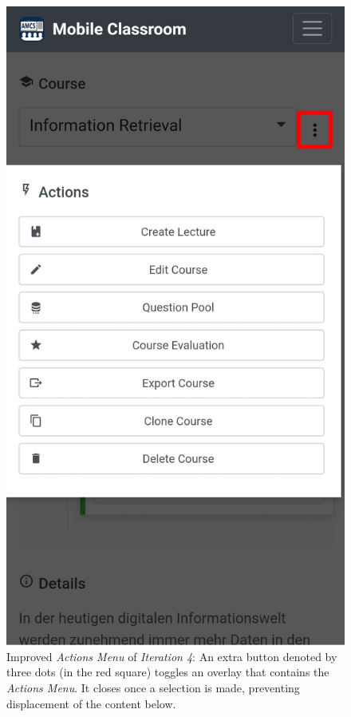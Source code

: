 \begin{figure}
\begin{minipage}[t]{.5\textwidth}
		\label{fig:main_view_course_options_bad}
	\end{minipage}%
	\begin{minipage}[t]{.5\textwidth}
		\centering
		\includegraphics[width=0.95\linewidth]{screenshots/redesign/main_view_iteration_4_actions.jpg}
		\captionsetup{width=.8\linewidth}
		\captionsetup{format=plain}
		\caption{Improved \emph{Actions Menu} of \emph{Iteration 4}: An extra button denoted by three dots (in the red square) toggles an overlay that contains the \emph{Actions Menu}. It closes once a selection is made, preventing displacement of the content below.}
		\label{fig:main_view_course_options_good}
	\end{minipage}
\end{figure}

